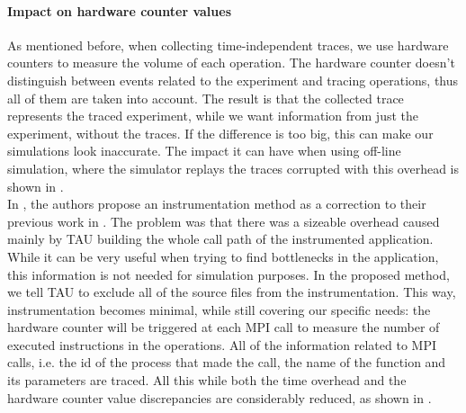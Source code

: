 \paragraph{Impact on hardware counter values}
As mentioned before, when collecting time-independent traces, we use
hardware counters to measure the volume of each operation. The
hardware counter doesn't distinguish between events related to the
experiment and tracing operations, thus all of them are taken into
account. The result is that the collected trace represents the traced
experiment, while we want information from just the experiment,
without the traces. If the difference is too big, this can make our
simulations look inaccurate. The impact it can have when using
off-line simulation, where the simulator replays the traces corrupted
with this overhead is shown in \cite{dms12}.\\[0.5cm]
In \cite{dms12}, the authors propose an instrumentation method as a
correction to their previous work in \cite{dmsq11}. The problem was
that there was a sizeable overhead caused mainly by TAU building the
whole call path of the instrumented application. While it can be
very useful when trying to find bottlenecks in the application, this
information is not needed for simulation purposes. In the proposed
method, we tell TAU to exclude all of the source files from the
instrumentation. This way, instrumentation becomes minimal, while
still covering our specific needs: the hardware counter will be
triggered at each MPI call to measure the number of executed
instructions in the operations. All of the information related to MPI
calls, i.e. the id of the process that made the call, the name of the
function and its parameters are traced. All this while both the time
overhead and the hardware counter value discrepancies are considerably
reduced, as shown in \cite{dms12}.
